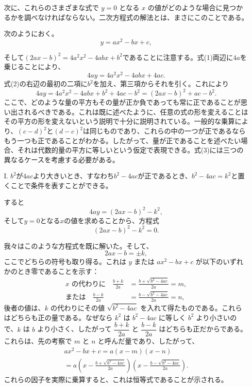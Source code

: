 \documentclass[a4paper,11pt,openany]{ltjsbook}
\newcommand{\Add}[1]{#1}
\begin{document}
次に、これらのさまざまな式で $y = 0$ となる $x$ の値がどのような場合に見つかるかを調べなければならない。二次方程式の解法とは、まさにこのことである。

次のようにおく。
\[
y = ax^{2} - bx + c\Add{,}
\tag{1}
\]


そして$(2ax - b)^2 = 4a^2x^2 - 4abx + b^2$であることに注意する。式(1)両辺に$4a$を乗じることにより、
\[
4ay = 4a^{2} x^{2} - 4abx + 4ac\Add{.}
\tag{2}
\]
式(2)の右辺の最初の二項に$b^2$を加え、第三項からそれを引く。これにより
\[
4ay = 4a^{2} x^{2} - 4abx + b^{2} + 4ac - b^{2}
  = (2ax - b)^{2} + ac - b^{2}\Add{.}
\tag{3}
\]
ここで、どのような量の平方もその量が正か負であっても常に正であることが思い出されるべきである。これは既に述べたように、任意の式の形を変えることはその平方の形を変えないという説明で十分に説明されている。一般的な乗算により、$(c - d)^2$と$(d - c)^2$は同じものであり、これらの中の一つが正であるならもう一つも正であることがわかる。したがって、量が正であることを述べたい場合、それは代数的量の平方に等しいという仮定で表現できる。式(3)には三つの異なるケースを考慮する必要がある。

I. $b^2$が$4ac$より大きいとき、すなわち$b^2 - 4ac$が正であるとき、$b^2 - 4ac = k^2$と置くことで条件を表すことができる。

すると
\[
4ay = (2ax - b)^{2} - k^{2}\Add{,}
\tag{4}
\]
そして$y = 0$となる$x$の値を求めることから、方程式
\[
(2ax - b)^{2} - k^{2} = 0.
\]

我々はこのような方程式を既に解いた。そして、
\[
2ax - b = \pm k,
\]
ここでどちらの符号も取り得る。これは \(y\) または \(ax^2 - bx + c\) が以下のいずれかのとき零であることを示す：
\begin{align*}
\text{$x$ の代わりに}\quad
\frac{b + k}{2a} &= \frac{b + \sqrt{b^{2} - 4ac}}{2a} = m, \\
\text{または}\quad
\frac{b - k}{2a} &= \frac{b - \sqrt{b^{2} - 4ac}}{2a} = n,
\end{align*}
後者の値は、$k$ の代わりにその値 $\sqrt{b^{2} - 4ac}$ を入れて得たものである。これらはどちらも正の量である。なぜなら $k^{2}$ は $b^{2} - 4ac$ に等しく $b^{2}$ より小さいので、$k$ は $b$ より小さく、したがって $\dfrac{b + k}{2a}$ と $\dfrac{b - k}{2a}$ はどちらも正だからである。これらは、先の考察で $m$ と $n$ と呼んだ量であり、したがって、
\begin{multline*}
ax^2 - bx + c = a(x - m)(x - n) \\
= a \left( x - \frac{b + \sqrt{b^2 - 4ac}}{2a} \right)
      \left( x - \frac{b - \sqrt{b^2 - 4ac}}{2a} \right).
\end{multline*}
これらの因子を実際に乗算すると、これは恒等式であることが示される。
\end{document}
